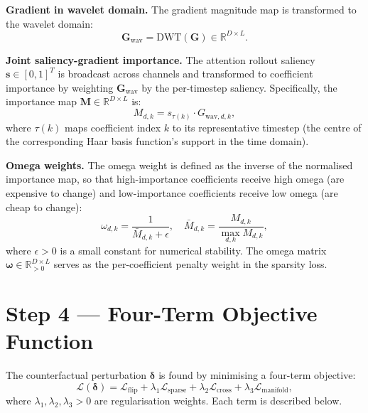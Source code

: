 \textbf{Gradient in wavelet domain.} The gradient magnitude map is transformed to the wavelet domain:
\begin{equation}
    \mathbf{G}_{\text{wav}} = \text{DWT}(\mathbf{G}) \in \mathbb{R}^{D \times L}.
\end{equation}

\textbf{Joint saliency-gradient importance.} The attention rollout saliency $\mathbf{s} \in [0,1]^T$ is broadcast across channels and transformed to coefficient importance by weighting $\mathbf{G}_{\text{wav}}$ by the per-timestep saliency. Specifically, the importance map $\mathbf{M} \in \mathbb{R}^{D \times L}$ is:
\begin{equation}
    M_{d,k} = s_{\tau(k)} \cdot G_{\text{wav},d,k},
\end{equation}
where $\tau(k)$ maps coefficient index $k$ to its representative timestep (the centre of the corresponding Haar basis function's support in the time domain).

\textbf{Omega weights.} The omega weight is defined as the inverse of the normalised importance map, so that high-importance coefficients receive high omega (are expensive to change) and low-importance coefficients receive low omega (are cheap to change):
\begin{equation}
    \omega_{d,k} = \frac{1}{\bar{M}_{d,k} + \epsilon}, \quad \bar{M}_{d,k} = \frac{M_{d,k}}{\max_{d,k} M_{d,k}},
\end{equation}
where $\epsilon > 0$ is a small constant for numerical stability. The omega matrix $\boldsymbol{\omega} \in \mathbb{R}^{D \times L}_{>0}$ serves as the per-coefficient penalty weight in the sparsity loss.

\section{Step 4 — Four-Term Objective Function}

The counterfactual perturbation $\boldsymbol{\delta}$ is found by minimising a four-term objective:
\begin{equation}
    \mathcal{L}(\boldsymbol{\delta}) = \mathcal{L}_{\text{flip}} + \lambda_1 \mathcal{L}_{\text{sparse}} + \lambda_2 \mathcal{L}_{\text{cross}} + \lambda_3 \mathcal{L}_{\text{manifold}},
\end{equation}
where $\lambda_1, \lambda_2, \lambda_3 > 0$ are regularisation weights. Each term is described below.

